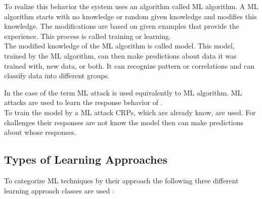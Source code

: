 To realize this behavior the system uses an algorithm called \ac{ML} algorithm.
A \ac{ML} algorithm starts with no knowledge or random given knowledge and modifies this knowledge.
The modifications are based on given examples that provide the experience. 
This process is called training or learning.\\
The modified knowledge of the \ac{ML} algorithm is called model.
This model, trained by the \ac{ML} algorithm, can then make predictions about data it was trained with, new data, or both.
It can recognize pattern or correlations and can classify data into different groups.


In the case of \pufs the term \ac{ML} attack is used equivalently to \ac{ML} algorithm.
\ac{ML} attacks are used to learn the response behavior of \pufs.\\
To train the model by a \ac{ML} attack \acp{CRP}, which are already know, are used.
For challenges their responses are not know the model then can make predictions about whose responses.


\subsection{Types of Learning Approaches}

To categorize \ac{ML} techniques by their approach the following three different learning approach classes are used \cite{2017MachineLearning}:

